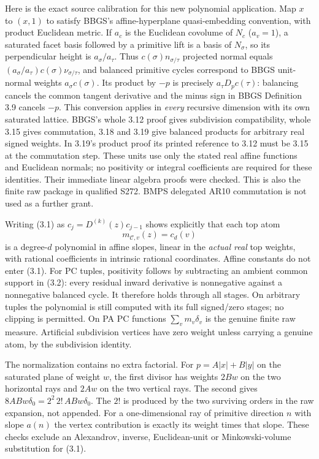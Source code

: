 \documentclass[11pt]{article}
\begin{document}
Here is the exact source calibration for this new polynomial application. Map $x$ to $(x,1)$ to satisfy BBGS's affine-hyperplane quasi-embedding convention, with product Euclidean metric. If $a_c$ is the Euclidean covolume of $N_c$ ($a_v=1$), a saturated facet basis followed by a primitive lift is a basis of $N_\sigma$, so its perpendicular height is $a_\sigma/a_\tau$. Thus $c(\sigma)n_{\sigma/\tau}$ projected normal equals $(a_\sigma/a_\tau)c(\sigma)\nu_{\sigma/\tau}$, and balanced primitive cycles correspond to BBGS unit-normal weights $a_\sigma c(\sigma)$. Its product by $-p$ is precisely $a_\tau D_pc(\tau)$: balancing cancels the common tangent derivative and the minus sign in BBGS Definition 3.9 cancels $-p$. This conversion applies in \emph{every} recursive dimension with its own saturated lattice. BBGS's whole 3.12 proof gives subdivision compatibility, whole 3.15 gives commutation, 3.18 and 3.19 give balanced products for arbitrary real signed weights. In 3.19's product proof its printed reference to 3.12 must be 3.15 at the commutation step. These units use only the stated real affine functions and Euclidean normals; no positivity or integral coefficients are required for these identities. Their immediate linear algebra proofs were checked. This is also the finite raw package in qualified S272. BMPS delegated AR10 commutation is not used as a further grant.

Writing (3.1) as $c_j=D^{(k)}(z)c_{j-1}$ shows explicitly that each top atom
\[
                         m_{\mathcal C,v}(z)=c_d(v)                  \tag{3.3}
\]
is a degree-$d$ polynomial in affine slopes, linear in the \emph{actual real} top weights, with rational coefficients in intrinsic rational coordinates. Affine constants do not enter (3.1). For PC tuples, positivity follows by subtracting an ambient common support in (3.2): every residual inward derivative is nonnegative against a nonnegative balanced cycle. It therefore holds through all stages. On arbitrary tuples the polynomial is still computed with its full signed/zero stages; no clipping is permitted. On PA PC functions $\sum_v m_v\delta_v$ is the genuine finite raw measure. Artificial subdivision vertices have zero weight unless carrying a genuine atom, by the subdivision identity.

The normalization contains no extra factorial. For $p=A|x|+B|y|$ on the saturated plane of weight $w$, the first divisor has weights $2Bw$ on the two horizontal rays and $2Aw$ on the two vertical rays. The second gives $8ABw\delta_0=2^2\,2!\,ABw\delta_0$. The $2!$ is produced by the two surviving orders in the raw expansion, not appended. For a one-dimensional ray of primitive direction $n$ with slope $a(n)$ the vertex contribution is exactly its weight times that slope. These checks exclude an Alexandrov, inverse, Euclidean-unit or Minkowski-volume substitution for (3.1).
\end{document}
